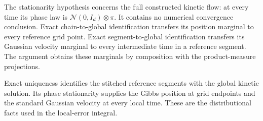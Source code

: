 \documentclass[11pt,a4paper]{article}
\begin{document}
The stationarity hypothesis concerns the full constructed kinetic flow: at every time its phase law is \(\mathcal N(0,I_d)\otimes\pi\). It contains no numerical convergence conclusion. Exact chain-to-global identification transfers its position marginal to every reference grid point. Exact segment-to-global identification transfers its Gaussian velocity marginal to every intermediate time in a reference segment. The argument obtains these marginals by composition with the product-measure projections.



Exact uniqueness identifies the stitched reference segments with the global kinetic solution. Its phase stationarity supplies the Gibbs position at grid endpoints and the standard Gaussian velocity at every local time. These are the distributional facts used in the local-error integral.
\end{document}
